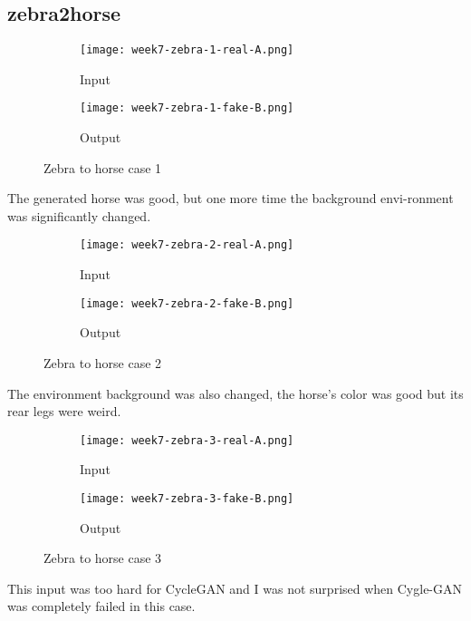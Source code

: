\subsection{zebra2horse}
\begin{figure}[!ht]
\centering
\begin{subfigure}{0.5\textwidth}
  \centering
  \texttt{[image: week7-zebra-1-real-A.png]}
  \caption{Input}
\end{subfigure}%
\begin{subfigure}{0.5\textwidth}
  \centering
  \texttt{[image: week7-zebra-1-fake-B.png]}
  \caption{Output}
\end{subfigure}
\caption{Zebra to horse case 1}
\end{figure}
The generated horse was good, but one more time the background envi-ronment was significantly changed.

\newpage
\begin{figure}[!ht]
\centering
\begin{subfigure}{0.5\textwidth}
  \centering
  \texttt{[image: week7-zebra-2-real-A.png]}
  \caption{Input}
\end{subfigure}%
\begin{subfigure}{0.5\textwidth}
  \centering
  \texttt{[image: week7-zebra-2-fake-B.png]}
  \caption{Output}
\end{subfigure}
\caption{Zebra to horse case 2}
\end{figure}
The environment background was also changed, the horse's color was good but its rear legs were weird.

\begin{figure}[!ht]
\centering
\begin{subfigure}{0.5\textwidth}
  \centering
  \texttt{[image: week7-zebra-3-real-A.png]}
  \caption{Input}
\end{subfigure}%
\begin{subfigure}{0.5\textwidth}
  \centering
  \texttt{[image: week7-zebra-3-fake-B.png]}
  \caption{Output}
\end{subfigure}
\caption{Zebra to horse case 3}
\end{figure}
This input was too hard for CycleGAN and I was not surprised when Cygle-GAN was completely failed in this case.

